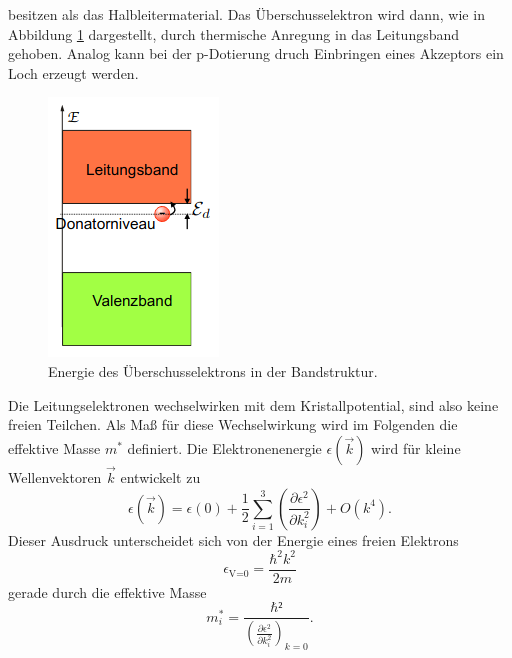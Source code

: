 besitzen als das Halbleitermaterial. Das Überschusselektron wird dann, wie in Abbildung \ref{fig:Donatorenergie} dargestellt, durch thermische Anregung in das
Leitungsband gehoben. Analog kann bei der p-Dotierung druch Einbringen eines Akzeptors ein Loch erzeugt werden. 
\begin{figure}[H]
    \centering
    \includegraphics[scale=0.8]{pictures/Donatorelektron.png}
    \caption{Energie des Überschusselektrons in der Bandstruktur. \cite{Halbleiter}}
    \label{fig:Donatorenergie}
\end{figure}
\noindent
Die Leitungselektronen wechselwirken mit dem Kristallpotential, sind also keine freien Teilchen. Als Maß für diese Wechselwirkung wird im Folgenden die 
effektive Masse $m^*$ definiert. Die Elektronenenergie $\epsilon(\vec{k})$ wird für kleine Wellenvektoren $\vec{k}$ entwickelt zu
\begin{equation}
    \epsilon(\vec{k})=\epsilon(0)+\frac{1}{2}\sum_{i=1}^3\left(\frac{\partial \epsilon^2}{\partial k_i^2}\right)+O(k^4) .
    \label{eqn:Taylor}
\end{equation}
Dieser Ausdruck unterscheidet sich von der Energie eines freien Elektrons
\begin{equation*}
    \epsilon_\text{V=0}=\frac{\hbar^2 k^2}{2m}
\end{equation*}
gerade durch die effektive Masse
\begin{equation*}
    m_i^*=\frac{\hbar²}{\left(\frac{\partial \epsilon^2}{\partial k_i^2}\right)_{k=0}} .
\end{equation*}

